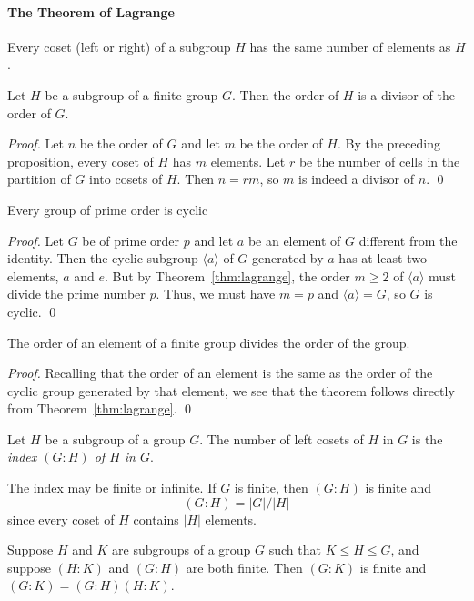 \paragraph{The Theorem of Lagrange}
\begin{proposition} Every coset (left or right) of a subgroup $H$ has the
same number of elements as $H$.
\end{proposition}
\begin{theorem}
\label{thm:lagrange}
Let $H$ be a subgroup of a finite group $G$.  Then the order of $H$ is
a divisor of the order of $G$.
\end{theorem}
\begin{proof} Let $n$ be the order of $G$ and let $m$ be the order of
$H$.  By the preceding proposition, every coset of $H$ has $m$ elements.  Let
$r$ be the number of cells in the partition of $G$ into cosets of
$H$.  Then $n=rm$, so $m$ is indeed a divisor of $n$. \qed
\end{proof}
\begin{corollary} Every group of prime order is cyclic 
\end{corollary}
\begin{proof} Let $G$ be of prime order $p$ and let $a$ be an element
of $G$ different from the identity.  Then the cyclic subgroup 
$\langle a \rangle$ of $G$ generated by $a$ has at least two elements,
$a$ and $e$.  But by Theorem~\ref{thm:lagrange}, the order $m\geq 2$
of $\langle a \rangle$ must divide the prime number $p$.  Thus, we
must have $m=p$ and $\langle a \rangle = G$, so $G$ is cyclic. \qed
\end{proof}
\begin{theorem} The order of an element of a finite group divides the
order of the group.
\end{theorem}
\begin{proof} Recalling that the order of an element is the same as
the order of the cyclic group generated by that element, we see that
the theorem follows directly from Theorem~\ref{thm:lagrange}. \qed
\end{proof}
\begin{definition}[Index of $H$ in $G$]
Let $H$ be a subgroup of a group $G$.  The number of left cosets of
$H$ in $G$ is the \emph{index $(G:H)$ of $H$ in $G$}.
\end{definition}
The index may be finite or infinite.  If $G$ is finite, then $(G:H)$
is finite and 
\[ (G:H) = |G|/|H|\]
since every coset of $H$ contains $|H|$ elements.
\begin{theorem}
Suppose $H$ and $K$ are subgroups of a group $G$ such that 
$K \leq H \leq G$, and suppose $(H:K)$ and $(G:H)$ are both
finite. Then $(G:K)$ is finite and $(G:K) = (G:H)(H:K)$.
\end{theorem}

